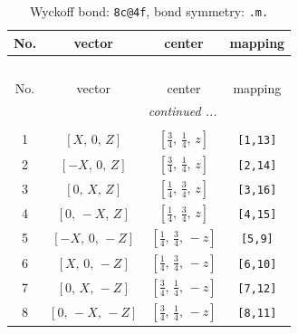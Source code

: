 \documentclass[fleqn,8pt]{jsarticle}
\begin{document}
\renewcommand{\arraystretch}{1.2}
\begin{longtable}{cccc}
\caption{Wyckoff bond: {\tt 8c@4f}, bond symmetry: {\tt .m.}}
 \\
 \hline \hline
No. & vector & center & mapping \\ \hline \endfirsthead

\multicolumn{3}{l}{\tablename\ \thetable{}} \\
 \hline \hline
No. & vector & center & mapping \\ \hline \endhead

 \hline \hline
\multicolumn{3}{r}{\footnotesize\it continued ...} \\ \endfoot

 \hline \hline
\multicolumn{3}{r}{} \\ \endlastfoot

1 & $\left[ X,\, 0,\, Z \right]$ & $\left[ \frac{3}{4},\, \frac{1}{4},\, z \right]$ & {\tt [1,13]} \\ \hline
2 & $\left[ - X,\, 0,\, Z \right]$ & $\left[ \frac{3}{4},\, \frac{1}{4},\, z \right]$ & {\tt [2,14]} \\ \hline
3 & $\left[ 0,\, X,\, Z \right]$ & $\left[ \frac{1}{4},\, \frac{3}{4},\, z \right]$ & {\tt [3,16]} \\ \hline
4 & $\left[ 0,\, - X,\, Z \right]$ & $\left[ \frac{1}{4},\, \frac{3}{4},\, z \right]$ & {\tt [4,15]} \\ \hline
5 & $\left[ - X,\, 0,\, - Z \right]$ & $\left[ \frac{1}{4},\, \frac{3}{4},\, - z \right]$ & {\tt [5,9]} \\ \hline
6 & $\left[ X,\, 0,\, - Z \right]$ & $\left[ \frac{1}{4},\, \frac{3}{4},\, - z \right]$ & {\tt [6,10]} \\ \hline
7 & $\left[ 0,\, X,\, - Z \right]$ & $\left[ \frac{3}{4},\, \frac{1}{4},\, - z \right]$ & {\tt [7,12]} \\ \hline
8 & $\left[ 0,\, - X,\, - Z \right]$ & $\left[ \frac{3}{4},\, \frac{1}{4},\, - z \right]$ & {\tt [8,11]} \\
\end{longtable}
\renewcommand{\arraystretch}{1.2}
\end{document}
